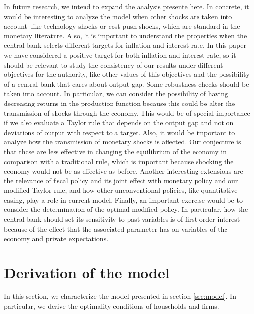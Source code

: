 \documentclass[11pt]{article}
\numberwithin{equation}{section}
\begin{document}
In future research, we intend to expand the analysis presente here. In concrete, it would be interesting to analyze the model when other shocks are taken into account, like technology shocks or cost-push shocks, which are standard in the monetary literature. Also, it is important to understand the properties when the central bank selects different targets for inflation and interest rate. In this paper we have considered a positive target for both inflation and interest rate, so it should be relevant to study the consistency of our results under different objectives for the authority, like other values of this objectives and the possibility of a central bank that cares about output gap. Some robustness checks should be taken into account. In particular, we can consider the possibility of having decreasing returns in the production function because this could be alter the transmission of shocks through the economy. This would be of special importance if we also evaluate a Taylor rule that depends on the output gap and not on deviations of output with respect to a target. Also, it would be important to analyze how the transmission of monetary shocks is affected. Our conjecture is that those are less effective in changing the equilibrium of the economy in comparison with a traditional rule, which is important because shocking the economy would not be as effective as before. Another interesting extensions are the relevance of fiscal policy and its joint effect with monetary policy and our modified Taylor rule, and how other unconventional policies, like quantitative easing, play a role in current model. Finally, an important exercise would be to consider the determination of the optimal modified policy. In particular, how the central bank should set its sensitivity to past variables is of first order interest because of the effect that the associated parameter has on variables of the economy and private expectations.




\newpage\appendix

\section{Derivation of the model}\label{app:derivation}

In this section, we characterize the model presented in section \ref{sec:model}. In particular, we derive the optimality conditions of households and firms.
\end{document}
